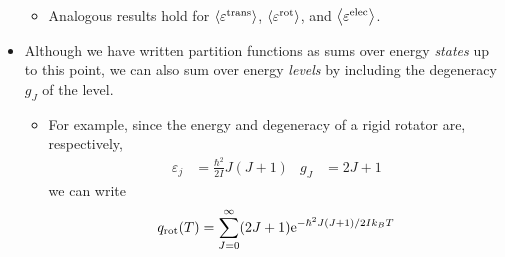 \documentclass[../notes.tex]{subfiles}
\begin{document}
\begin{itemize}
\begin{equation*}
    \end{equation*}
    \begin{itemize}
        \item Analogous results hold for $\prb{\varepsilon^\text{trans}}$, $\prb{\varepsilon^\text{rot}}$, and $\prb{\varepsilon^\text{elec}}$.
    \end{itemize}
    \item Although we have written partition functions as sums over energy \emph{states} up to this point, we can also sum over energy \emph{levels} by including the degeneracy $g_J$ of the level.
    \begin{itemize}
        \item For example, since the energy and degeneracy of a rigid rotator are, respectively,
        \begin{align*}
            \varepsilon_j &= \frac{\hbar^2}{2I}J(J+1)&
            g_J &= 2J+1
        \end{align*}
        we can write
        \begin{equation*}
            q_\text{rot}(T) = \sum_{J=0}^\infty(2J+1)\e[-\hbar^2J(J+1)/2Ik_BT]
        \end{equation*}
    \end{itemize}
\end{itemize}
\end{document}
